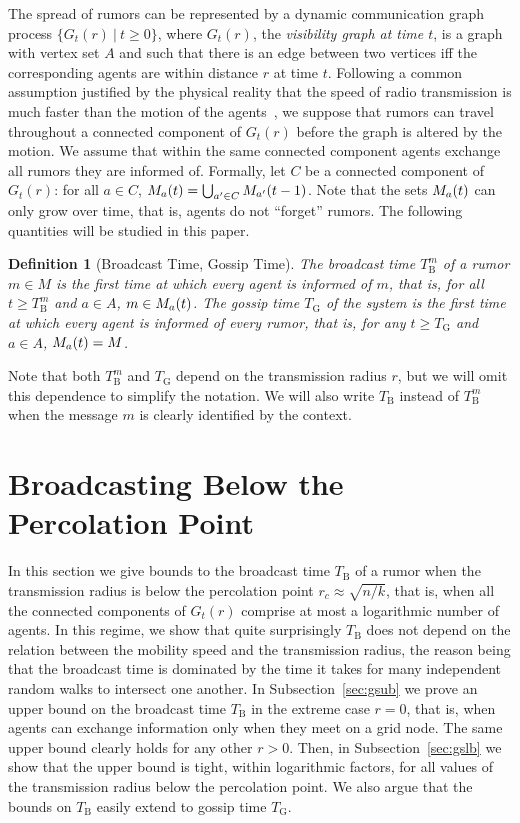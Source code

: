 \documentclass[11pt]{article}
\newcommand{\newterm}[1]{\emph{#1}}
\newcommand{\bt}{T_{\mathrm{B}}}
\newcommand{\gt}{T_{\mathrm{G}}}
\newtheorem{defi}{Definition}
\begin{document}
The spread of rumors can be represented by a dynamic communication
graph process \sloppy $\{G_t(r)~|~t\geq 0\}$, where $G_t(r)$, the
\newterm{visibility graph at time $t$}, is a graph with vertex set $A$
and such that there is an edge between two vertices iff the
corresponding agents are within distance $r$ at time $t$.
Following a
common assumption justified by the physical reality that the speed of
radio transmission is much faster than the motion of the
agents~\cite{PeresSSS11}, we suppose that rumors can travel throughout
a connected component of $G_t(r)$ before the graph is altered by the
motion.  We assume that within the same connected component agents
exchange all rumors they are informed of.  Formally, let $C$ be a
connected component of $G_t(r)$: for all $a \in C$, $M_{a}(t) =
\bigcup_{a' \in C} M_{a'}(t-1)$.  Note that the sets $M_{a}(t)$
can only grow over time, that is, agents do not ``forget'' rumors.
The following quantities will be studied in this paper.
\begin{defi}[Broadcast Time, Gossip Time]
The \newterm{broadcast time} $\bt^m$ of a rumor $m \in M$ is the
first time at which every agent is informed of $m$, that is, for all
$t \geq \bt^m$ and $a \in A$, $m \in M_{a}(t)$.  The
\newterm{gossip time} $\gt$ of the system is the first time at
which every agent is informed of every rumor, that is, for any $t
\geq \gt$ and $a \in A$, $M_{a}(t) = M$.
\end{defi}

Note that both $\bt^m$ and $\gt$ depend on the transmission radius
$r$, but we will omit this dependence to simplify the notation.
We will also write $\bt$ instead of $\bt^m$ when the message $m$
is clearly identified by the context.


\section{Broadcasting Below the Percolation Point}
\label{sec:gs}

In this section we give bounds to the broadcast time $\bt$ of a
rumor when the transmission radius is below the percolation point $r_c
\approx \sqrt{n/k}$, that is, when all the connected components of
$G_t(r)$ comprise at most a logarithmic number of agents.  In this
regime, we show that quite surprisingly $\bt$ does not depend on the
relation between the mobility speed and the transmission radius, the
reason being that the broadcast time is dominated by the time it takes
for many independent random walks to intersect one another.  In
Subsection~\ref{sec:gsub} we prove an upper bound on the broadcast
time $\bt$ in the extreme case $r=0$, that is, when agents can
exchange information only when they meet on a grid node. The same
upper bound clearly holds for any other $r>0$. Then, in
Subsection~\ref{sec:gslb} we show that the upper bound is tight,
within logarithmic factors, for all values of the transmission radius
below the percolation point.  We also argue that the bounds on $\bt$
easily extend to gossip time $\gt$.
\end{document}
